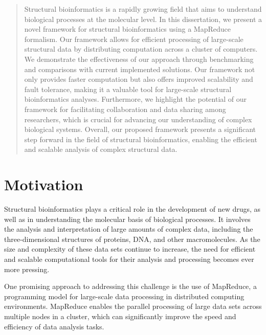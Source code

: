 \documentclass[]{final_report}
\begin{document}
\maketitle

\newtheorem{definition}{Definition}[section]
\renewcommand\thesection{\arabic{section}}

\begin{abstract}
    Structural bioinformatics is a rapidly growing field that aims to understand biological processes at the molecular level. In this dissertation, we present a novel framework for structural bioinformatics using a MapReduce formalism. Our framework allows for efficient processing of large-scale structural data by distributing computation across a cluster of computers. We demonstrate the effectiveness of our approach through benchmarking and comparisons with current implemented solutions. Our framework not only provides faster computation but also offers improved scalability and fault tolerance, making it a valuable tool for large-scale structural bioinformatics analyses. Furthermore, we highlight the potential of our framework for facilitating collaboration and data sharing among researchers, which is crucial for advancing our understanding of complex biological systems. Overall, our proposed framework presents a significant step forward in the field of structural bioinformatics, enabling the efficient and scalable analysis of complex structural data.
\end{abstract}

\section{Motivation}
Structural bioinformatics plays a critical role in the development of new drugs, as well as in understanding the molecular basis of biological processes. It involves the analysis and interpretation of large amounts of complex data, including the three-dimensional structures of proteins, DNA, and other macromolecules. As the size and complexity of these data sets continue to increase, the need for efficient and scalable computational tools for their analysis and processing becomes ever more pressing.

One promising approach to addressing this challenge is the use of MapReduce, a programming model for large-scale data processing in distributed computing environments. MapReduce enables the parallel processing of large data sets across multiple nodes in a cluster, which can significantly improve the speed and efficiency of data analysis tasks.
\end{document}

